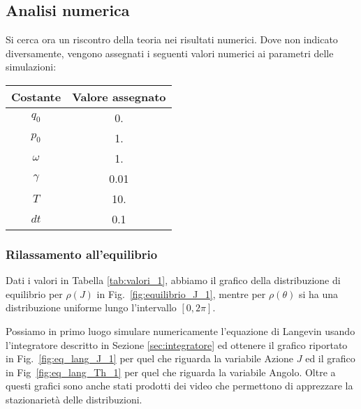 \documentclass[10pt,a4paper]{article}
\begin{document}
\subsection{Analisi numerica}

Si cerca ora un riscontro della teoria nei risultati numerici. Dove non indicato diversamente, vengono assegnati i seguenti valori numerici ai parametri delle simulazioni:
\begin{center}
	\begin{tabular}{cS}
	\toprule
	Costante & {Valore assegnato} \\
	\midrule
	$q_0$		& 0.	\\
	$p_0$		& 1.	\\
	$\omega$	& 1.	\\
	$\gamma$	& 0.01	\\
	$T$			& 10.	\\
	$dt$		& 0.1	\\
	\bottomrule
	\end{tabular}
	\label{tab:valori_1}
\end{center}

\subsubsection{Rilassamento all'equilibrio}

Dati i valori in Tabella \ref{tab:valori_1}, abbiamo il grafico della distribuzione di equilibrio per \(\rho(J)\) in Fig.~\ref{fig:equilibrio_J_1}, mentre per \(\rho(\theta)\) si ha una distribuzione uniforme lungo l'intervallo \([0,2\pi]\).

Possiamo in primo luogo simulare numericamente l'equazione di Langevin usando l'integratore descritto in Sezione \ref{sec:integratore} ed ottenere il grafico riportato in Fig.~\ref{fig:eq_lang_J_1} per quel che riguarda la variabile Azione \(J\) ed il grafico in Fig~\ref{fig:eq_lang_Th_1} per quel che riguarda la variabile Angolo. Oltre a questi grafici sono anche stati prodotti dei video che permettono di apprezzare la stazionarietà delle distribuzioni.
\end{document}

